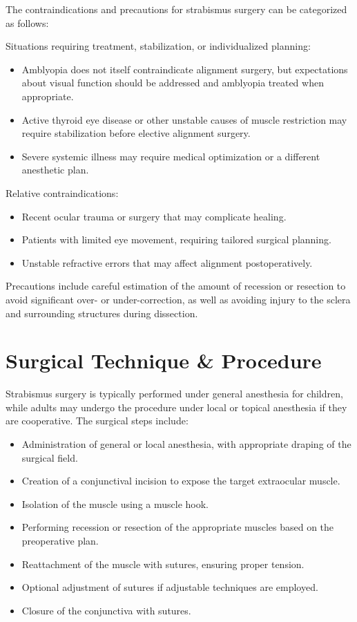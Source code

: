 The contraindications and precautions for strabismus surgery can be categorized as follows:

Situations requiring treatment, stabilization, or individualized planning:

\begin{itemize}
  \item Amblyopia does not itself contraindicate alignment surgery, but expectations about visual function should be addressed and amblyopia treated when appropriate.
  \item Active thyroid eye disease or other unstable causes of muscle restriction may require stabilization before elective alignment surgery.
  \item Severe systemic illness may require medical optimization or a different anesthetic plan.
\end{itemize}

Relative contraindications:

\begin{itemize}
  \item Recent ocular trauma or surgery that may complicate healing.
  \item Patients with limited eye movement, requiring tailored surgical planning.
  \item Unstable refractive errors that may affect alignment postoperatively.
\end{itemize}

Precautions include careful estimation of the amount of recession or resection to avoid significant over- or under-correction, as well as avoiding injury to the sclera and surrounding structures during dissection.

\section*{Surgical Technique \& Procedure}
Strabismus surgery is typically performed under general anesthesia for children, while adults may undergo the procedure under local or topical anesthesia if they are cooperative. The surgical steps include:

\begin{itemize}
  \item Administration of general or local anesthesia, with appropriate draping of the surgical field.
  \item Creation of a conjunctival incision to expose the target extraocular muscle.
  \item Isolation of the muscle using a muscle hook.
  \item Performing recession or resection of the appropriate muscles based on the preoperative plan.
  \item Reattachment of the muscle with sutures, ensuring proper tension.
  \item Optional adjustment of sutures if adjustable techniques are employed.
  \item Closure of the conjunctiva with sutures.
\end{itemize}

